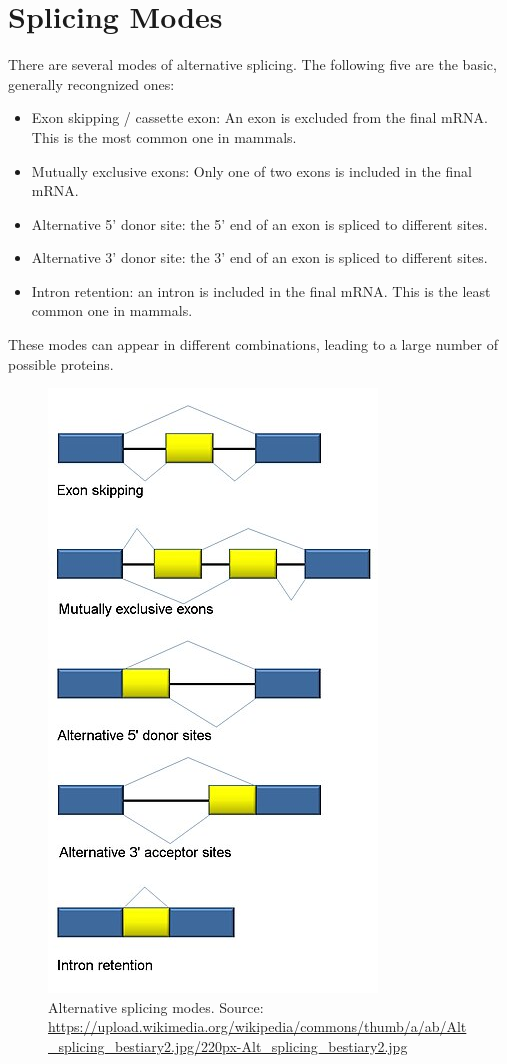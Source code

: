 \documentclass[twocolumn]{article}
\begin{document}
\section{Splicing Modes}
There are several modes of alternative splicing. The following five are the basic, generally recongnized ones:
\begin{itemize}
    \item Exon skipping / cassette exon: An exon is excluded from the final mRNA. This is the most common one in mammals.
    \item Mutually exclusive exons: Only one of two exons is included in the final mRNA.
    \item Alternative 5' donor site: the 5' end of an exon is spliced to different sites.
    \item Alternative 3' donor site: the 3' end of an exon is spliced to different sites.
    \item Intron retention: an intron is included in the final mRNA. This is the least common one in mammals.
\end{itemize}
These modes can appear in different combinations, leading to a large number of possible proteins.

\begin{figure}
    \centering
    \includegraphics[width=0.5\columnwidth]{Alt_splicing_bestiary2.jpg}
    \caption{Alternative splicing modes. Source: \url{https://upload.wikimedia.org/wikipedia/commons/thumb/a/ab/Alt_splicing_bestiary2.jpg/220px-Alt_splicing_bestiary2.jpg}}
\end{figure}
\end{document}

